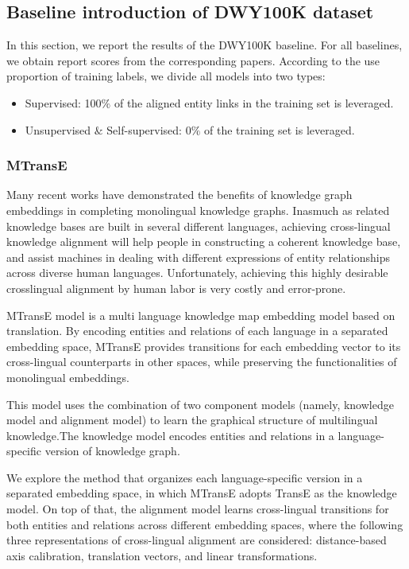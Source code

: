 \documentclass[sigconf]{acmart}
\begin{document}
{%
\subsection{Baseline introduction of DWY100K dataset}

In this section, we report the results of the DWY100K baseline. For all baselines, we obtain report scores from the corresponding papers. According to the use proportion of training labels, we divide all models into two types:

\begin{itemize}
\item Supervised: 100$\%$ of the aligned entity links in the training set is leveraged.
\item Unsupervised $\&$ Self-supervised: 0$\%$ of the training set is leveraged.
\end{itemize}

\subsubsection{MTransE \cite{chen2016multilingual}}

Many recent works have demonstrated the benefits of knowledge graph embeddings in completing monolingual knowledge graphs. Inasmuch as related knowledge bases are built in several different languages, achieving cross-lingual knowledge alignment will help people in constructing a coherent knowledge base, and assist machines in dealing with different expressions of entity relationships across diverse human languages. Unfortunately, achieving this highly desirable crosslingual alignment by human labor is very costly and error-prone. 

MTransE model is a multi language knowledge map embedding model based on translation. By encoding entities and relations of each language in a separated embedding space, MTransE provides transitions for each embedding vector to its cross-lingual counterparts in other spaces, while preserving the functionalities of monolingual embeddings.

This model uses the combination of two component models (namely, knowledge model and alignment model) to learn the graphical structure of multilingual knowledge.The knowledge model encodes entities and relations in a language-specific version of knowledge graph.

We explore the method that organizes each language-specific version in a separated embedding space, in which MTransE adopts TransE as the knowledge model. On top of that, the alignment model learns cross-lingual transitions for both entities and relations across different embedding spaces, where the following three representations of cross-lingual alignment are considered: distance-based axis calibration, translation vectors, and linear transformations.

}
\end{document}
